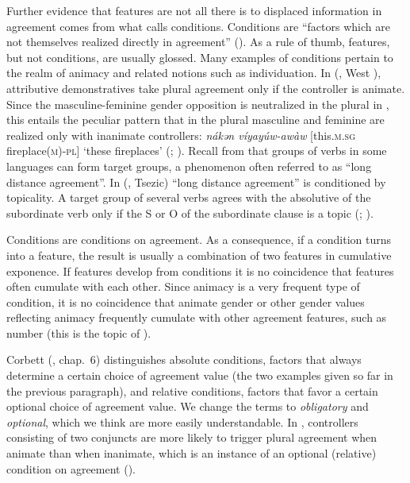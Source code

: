 \documentclass[output=collectionpaper]{langsci/langscibook}
\begin{document}
Further evidence that features are not all there is to displaced information in agreement comes from what \citealt{Corbett2006} calls conditions. Conditions are ``factors which are not themselves realized directly in agreement'' (\citealt[176]{Corbett2006}). As a rule of thumb, features, but not conditions, are usually glossed. Many examples of conditions pertain to the realm of animacy and related notions such as individuation. In  (, West ), attributive demonstratives take plural agreement only if the controller is animate. Since the masculine-feminine gender opposition is neutralized in the plural in , this entails the peculiar pattern that in the plural masculine and feminine are realized only with inanimate controllers: \textit{nákǝn víyayúw-awàw} [this.\textsc{m.sg} fireplace\textsc{(m)-pl}] `these fireplaces' (\citealt[193]{Schuh1998}; \citealt[178]{Corbett2006}). Recall from  that groups of verbs in some  languages can form target groups, a phenomenon often referred to as ``long distance agreement''. In  (, Tsezic) ``long distance agreement'' is conditioned by topicality. A target group of several verbs agrees with the absolutive of the subordinate verb only if the S or O of the subordinate clause is a topic (\citealt{Polinsky1999}; \citealt[197]{Corbett2006}).

Conditions are conditions on agreement. As a consequence, if a condition turns into a feature, the result is usually a combination of two features in cumulative exponence. If features develop from conditions it is no coincidence that features often cumulate with each other. Since animacy is a very frequent type of condition, it is no coincidence that animate gender or other gender values reflecting animacy frequently cumulate with other agreement features, such as number (this is the topic of ).

Corbett (\citeyear*{Corbett2006}, chap.~6) distinguishes absolute conditions, factors that always determine a certain choice of agreement value (the two examples given so far in the previous paragraph), and relative conditions, factors that favor a certain optional choice of agreement value. We change the terms to \emph{obligatory} and \emph{optional}, which we think are more easily understandable. In , controllers consisting of two conjuncts are more likely to trigger plural agreement when animate than when inanimate, which is an instance of an optional (relative) condition on agreement (\citealt[179]{Corbett2006}).
\end{document}
